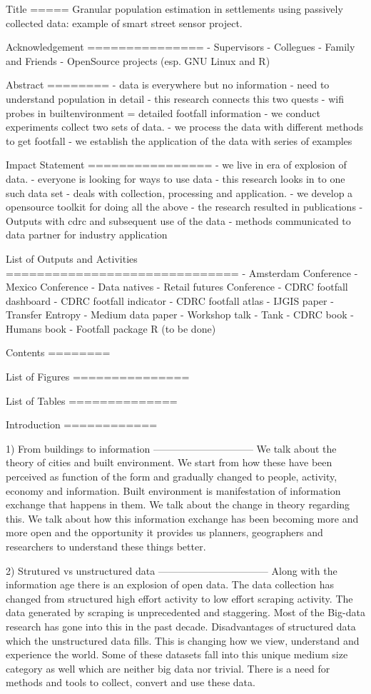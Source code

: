 Title
=====
Granular population estimation in settlements using passively collected data:
example of smart street sensor project.

Acknowledgement
===============
- Supervisors
- Collegues
- Family and Friends
- OpenSource projects
  (esp. GNU Linux and R)

Abstract
========
 - data is everywhere but no information
 - need to understand population in detail
 - this research connects this two quests
 - wifi probes in builtenvironment = detailed footfall information
 - we conduct experiments collect two sets of data.
 - we process the data with different methods to get footfall
 - we establish the application of the data with series of examples

Impact Statement
================
 - we live in era of explosion of data.
 - everyone is looking for ways to use data
 - this research looks in to one such data set
 - deals with collection, processing and application.
 - we develop a opensource toolkit for doing all the above
 - the research resulted in publications
 - Outputs with cdrc and subsequent use of the data 
 - methods communicated to data partner for industry application

List of Outputs and Activities
==============================
 - Amsterdam Conference
 - Mexico Conference
 - Data natives
 - Retail futures Conference 
 - CDRC footfall dashboard
 - CDRC footfall indicator
 - CDRC footfall atlas
 - IJGIS paper
 - Transfer Entropy
 - Medium data paper
 - Workshop talk - Tank
 - CDRC book
 - Humans book
 - Footfall package R (to be done)

Contents
========

List of Figures
===============

List of Tables
==============

Introduction
============

1) From buildings to information
------------------------------
We talk about the theory of cities and built environment. We start from how
these have been perceived as function of the form and gradually changed to
people, activity, economy and information.  Built environment is manifestation
of information exchange that happens in them. We talk about the change in theory
regarding this. We talk about how this information exchange has been becoming
more and more open and the opportunity it provides us planners, geographers and
researchers to understand these things better.

2) Strutured vs unstructured data
---------------------------------
Along with the information age there is an explosion of open data.  The data
collection has changed from structured high effort activity to low effort
scraping activity. The data generated by scraping is unprecedented and
staggering. Most of the Big-data research has gone into this in the past decade.
Disadvantages of structured data which the unstructured data fills. This is
changing how we view, understand and experience the world. Some of these datasets
fall into this unique medium size category as well which are neither big data
nor trivial. There is a need for methods and tools to collect, convert and use
these data.

